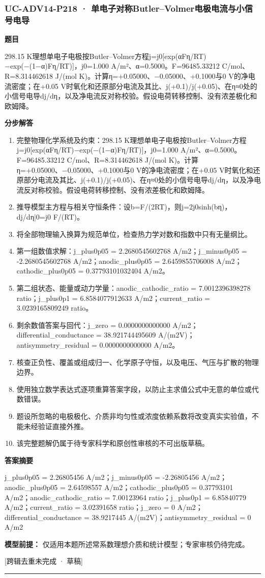\documentclass[UTF8,11pt,a4paper]{ctexart}
\begin{document}
\subsubsection*{UC-ADV14-P218 · 单电子对称Butler–Volmer电极电流与小信号电导}
\noindent\textbf{题目}\par
298.15 K理想单电子电极按Butler–Volmer方程j=j0[exp(αFη/RT)−exp(−(1−α)Fη/RT)]，j0=1.000 A/m²、α=0.5000。F=96485.33212 C/mol、R=8.314462618 J/(mol K)。计算η=+0.05000、−0.05000、+0.1000与0 V的净电流密度；在+0.05 V时氧化和还原部分电流及其比、j(+0.1)/j(+0.05)、在η≈0处的小信号电导dj/dη，以及净电流反对称校验。假设电荷转移控制、没有浓差极化和欧姆降。\par
\medskip\noindent\textbf{分步解答}
\begin{enumerate}
\item 完整物理化学系统及约束：298.15 K理想单电子电极按Butler–Volmer方程j=j0[exp(αFη/RT)−exp(−(1−α)Fη/RT)]，j0=1.000 A/m²、α=0.5000。F=96485.33212 C/mol、R=8.314462618 J/(mol K)。计算η=+0.05000、−0.05000、+0.1000与0 V的净电流密度；在+0.05 V时氧化和还原部分电流及其比、j(+0.1)/j(+0.05)、在η≈0处的小信号电导dj/dη，以及净电流反对称校验。假设电荷转移控制、没有浓差极化和欧姆降。
\item 推导模型主方程与相关守恒条件：设b=F/(2RT)，则j=2j0sinh(bη)，dj/dη|0=j0 F/(RT)。
\item 将全部物理输入换算为规范单位，检查热力学对数和指数中只有无量纲比。
\item 第一组数值求解：j\_plus0p05 = 2.2680545602768 A/m2；j\_minus0p05 = -2.2680545602768 A/m2；anodic\_plus0p05 = 2.6459855706008 A/m2；cathodic\_plus0p05 = 0.37793101032404 A/m2。
\item 第二组状态、能量或动力学量：anodic\_cathodic\_ratio = 7.0012396398278 ratio；j\_plus0p1 = 6.8584077912633 A/m2；current\_ratio = 3.0239165809249 ratio。
\item 剩余数值答案与回代：j\_zero = 0.0000000000000 A/m2；differential\_conductance = 38.921744495609 A/(m2V)；antisymmetry\_residual = 0.0000000000000 A/m2。
\item 核查正负性、覆盖或组成归一、化学原子守恒，以及电压、气压与扩散的物理边界。
\item 使用独立数学表达式逐项重算答案字段，以防止主求值公式中无意的单位或代数错误。
\item 题设所忽略的电极极化、介质非均匀性或浓度依赖系数将改变真实实验值，不能未经验证直接外推。
\item 该完整题解仍属于待专家科学和原创性审核的不可出版草稿。
\end{enumerate}
\noindent\textbf{答案摘要}\par
j\_plus0p05 = 2.26805456 A/m2；j\_minus0p05 = -2.26805456 A/m2；anodic\_plus0p05 = 2.64598557 A/m2；cathodic\_plus0p05 = 0.37793101 A/m2；anodic\_cathodic\_ratio = 7.00123964 ratio；j\_plus0p1 = 6.85840779 A/m2；current\_ratio = 3.02391658 ratio；j\_zero = 0 A/m2；differential\_conductance = 38.9217445 A/(m2V)；antisymmetry\_residual = 0 A/m2\par
\noindent\textbf{模型前提：}
仅适用本题所述常系数理想介质和统计模型；专家审核仍待完成。\par
\noindent\textcolor{red!65!black}{[跨辑去重未完成 · 草稿]} \par
\medskip\hrule\medskip
{}
\end{document}
